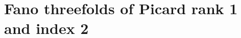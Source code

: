 \documentclass[11pt]{amsart}
\theoremstyle{definition}
\newcommand{\HHom}{\mathcal{H}om}
\DeclareMathOperator{\Hom}{Hom}
\DeclarePairedDelimiter{\set}{\lbrace}{\rbrace}
\DeclarePairedDelimiter{\pair}{\langle}{\rangle}
\begin{document}



\section{Fano threefolds of Picard rank 1 and index 2}
\label{sec_Fano_threefolds}
\end{document}
